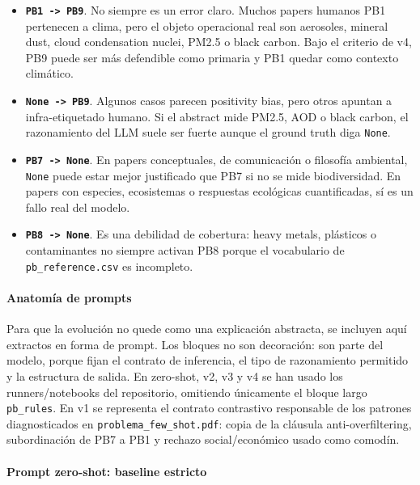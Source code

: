 \begin{itemize}
\item \textbf{\texttt{PB1 -> PB9}}. No siempre es un error claro. Muchos papers humanos PB1 pertenecen a clima, pero el objeto operacional real son aerosoles, mineral dust, cloud condensation nuclei, PM2.5 o black carbon. Bajo el criterio de v4, PB9 puede ser más defendible como primaria y PB1 quedar como contexto climático.
\item \textbf{\texttt{None -> PB9}}. Algunos casos parecen positivity bias, pero otros apuntan a infra-etiquetado humano. Si el abstract mide PM2.5, AOD o black carbon, el razonamiento del LLM suele ser fuerte aunque el ground truth diga \texttt{None}.
\item \textbf{\texttt{PB7 -> None}}. En papers conceptuales, de comunicación o filosofía ambiental, \texttt{None} puede estar mejor justificado que PB7 si no se mide biodiversidad. En papers con especies, ecosistemas o respuestas ecológicas cuantificadas, sí es un fallo real del modelo.
\item \textbf{\texttt{PB8 -> None}}. Es una debilidad de cobertura: heavy metals, plásticos o contaminantes no siempre activan PB8 porque el vocabulario de \texttt{pb\_reference.csv} es incompleto.
\end{itemize}

\paragraph*{Anatomía de prompts}

Para que la evolución no quede como una explicación abstracta, se incluyen aquí extractos en forma de prompt. Los bloques no son decoración: son parte del modelo, porque fijan el contrato de inferencia, el tipo de razonamiento permitido y la estructura de salida. En zero-shot, v2, v3 y v4 se han usado los runners/notebooks del repositorio, omitiendo únicamente el bloque largo \texttt{pb\_rules}. En v1 se representa el contrato contrastivo responsable de los patrones diagnosticados en \texttt{problema\_few\_shot.pdf}: copia de la cláusula anti-overfiltering, subordinación de PB7 a PB1 y rechazo social/económico usado como comodín.

\paragraph*{Prompt zero-shot: baseline estricto}

